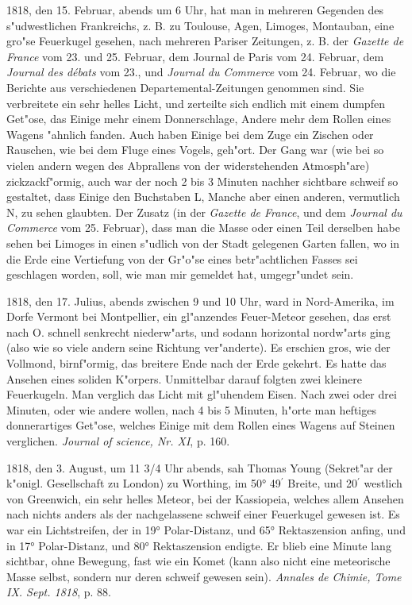 \documentclass[a4paper, 11pt, oneside, polutonikogreek, german]{article}
\begin{document}
1818, den 15. Februar, abends um 6 Uhr, hat man in mehreren Gegenden des s"udwestlichen Frankreichs, z. B. zu Toulouse, Agen, Limoges, Montauban, eine gro"se Feuerkugel gesehen, nach mehreren Pariser Zeitungen, z. B. der \emph{Gazette de France} vom 23. und 25. Februar, dem Journal de Paris vom 24. Februar, dem \emph{Journal des débats} vom 23., und \emph{Journal du Commerce} vom 24. Februar, wo die Berichte aus verschiedenen Departemental-Zeitungen genommen sind. Sie verbreitete ein sehr helles Licht, und zerteilte sich endlich mit einem dumpfen Get"ose, das Einige mehr einem Donnerschlage, Andere mehr dem Rollen eines Wagens "ahnlich fanden. Auch haben Einige bei dem Zuge ein Zischen oder Rauschen, wie bei dem Fluge eines Vogels, geh"ort. Der Gang war (wie bei so vielen andern wegen des Abprallens von der widerstehenden Atmosph"are) zickzackf"ormig, auch war der noch 2 bis 3 Minuten nachher sichtbare schweif so gestaltet, dass Einige den Buchstaben L, Manche aber einen anderen, vermutlich N, zu sehen glaubten. Der Zusatz (in der \emph{Gazette de France}, und dem \emph{Journal du Commerce} vom 25. Februar), dass man die Masse oder einen Teil derselben habe sehen bei Limoges in einen s"udlich von der Stadt gelegenen Garten fallen, wo in die Erde eine Vertiefung von der Gr"o"se eines betr"achtlichen Fasses sei geschlagen worden, soll, wie man mir gemeldet hat, umgegr"undet sein.

1818, den 17. Julius, abends zwischen 9 und 10 Uhr, ward in Nord-Amerika, im Dorfe Vermont bei Montpellier, ein gl"anzendes Feuer-Meteor gesehen, das erst nach O. schnell senkrecht niederw"arts, und sodann horizontal nordw"arts ging (also wie so viele andern seine Richtung ver"anderte). Es erschien gros, wie der Vollmond, birnf"ormig, das breitere Ende nach der Erde gekehrt. Es hatte das Ansehen eines soliden K"orpers. Unmittelbar darauf folgten zwei kleinere Feuerkugeln. Man verglich das Licht mit gl"uhendem Eisen. Nach zwei oder drei Minuten, oder wie andere wollen, nach 4 bis 5 Minuten, h"orte man heftiges donnerartiges Get"ose, welches Einige mit dem Rollen eines Wagens auf Steinen verglichen. \emph{Journal of science, Nr. XI}, p. 160.

1818, den 3. August, um 11 3/4 Uhr abends, sah Thomas Young (Sekret"ar der k"onigl. Gesellschaft zu London) zu Worthing, im 50° 49$^{\prime}$ Breite, und 20$^{\prime}$ westlich von Greenwich, ein sehr helles Meteor, bei der Kassiopeia, welches allem Ansehen nach nichts anders als der nachgelassene schweif einer Feuerkugel gewesen ist. Es war ein Lichtstreifen, der in 19° Polar-Distanz, und 65° Rektaszension anfing, und in 17° Polar-Distanz, und 80° Rektaszension endigte. Er blieb eine Minute lang sichtbar, ohne Bewegung, fast wie ein Komet (kann also nicht eine meteorische Masse selbst, sondern nur deren schweif gewesen sein). \emph{Annales de Chimie, Tome IX. Sept. 1818}, p. 88.
\end{document}
